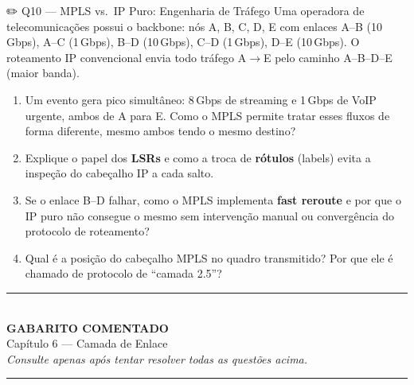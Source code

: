 \documentclass[11pt,a4paper]{article}
\begin{document}
\begin{questao}{✏️ Q10 --- MPLS vs.\ IP Puro: Engenharia de Tráfego}
Uma operadora de telecomunicações possui o backbone: nós A, B, C, D, E com enlaces A--B (10\,Gbps), A--C (1\,Gbps), B--D (10\,Gbps), C--D (1\,Gbps), D--E (10\,Gbps). O roteamento IP convencional envia todo tráfego A$\to$E pelo caminho A--B--D--E (maior banda).
\begin{enumerate}[label=(\alph*)]
    \item Um evento gera pico simultâneo: 8\,Gbps de streaming e 1\,Gbps de VoIP urgente, ambos de A para E. Como o MPLS permite tratar esses fluxos de forma diferente, mesmo ambos tendo o mesmo destino?
    \item Explique o papel dos \textbf{LSRs} e como a troca de \textbf{rótulos} (labels) evita a inspeção do cabeçalho IP a cada salto.
    \item Se o enlace B--D falhar, como o MPLS implementa \textbf{fast reroute} e por que o IP puro não consegue o mesmo sem intervenção manual ou convergência do protocolo de roteamento?
    \item Qual é a posição do cabeçalho MPLS no quadro transmitido? Por que ele é chamado de protocolo de ``camada 2.5''?
\end{enumerate}
\end{questao}

\clearpage

\begin{center}
\rule{\textwidth}{2.5pt}\\[8pt]
{\LARGE\bfseries GABARITO COMENTADO}\\[4pt]
{\large Capítulo 6 --- Camada de Enlace}\\[6pt]
{\small\itshape Consulte apenas após tentar resolver todas as questões acima.}\\[8pt]
\rule{\textwidth}{2.5pt}
\end{center}
\vspace{1em}
\end{document}
